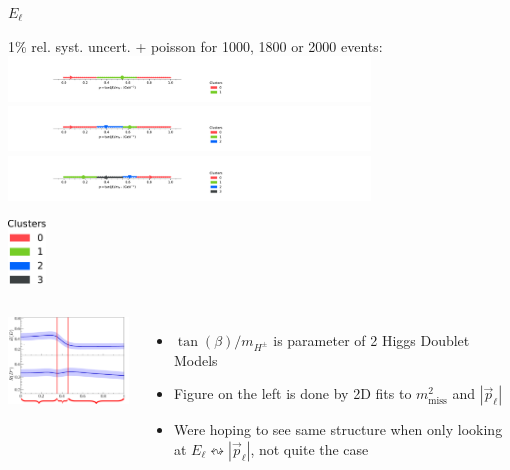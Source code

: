 \begin{frame}{$E_\ell$}{\relax}
	\centering
	\begin{changemargin}{-1cm}{-1cm}
	{
		\begin{minipage}{10cm}
			{\small 1\% rel. syst. uncert. + poisson for 1000, 1800 or 2000 events:}
			\centering
			{\includegraphics[clip, trim=4.5cm 1cm 21cm 2.0cm, height=1.2cm]{figures/from-paper/El_tanbeta_err1}}
			{\includegraphics[clip, trim=4.5cm 1cm 21cm 2.0cm, height=1.2cm]{figures/from-paper/El_tanbeta_err2}}
			{\includegraphics[clip, trim=4.5cm 1cm 21cm 2.0cm, height=1.2cm]{figures/from-paper/El_tanbeta_err3}}
	\end{minipage}
	}
	\begin{minipage}{2cm}
		\vspace{2cm}
		\includegraphics[height=1.7cm]{figures/from-paper/el_err3_legend.pdf}
	\end{minipage}
	\end{changemargin}
	\begin{columns}
	\includegraphics[width=5cm]{figures/type2_2hdm_vs_rd_rds_1205_5442_results_only_cluster.pdf}
	\begin{itemize}
	\item $\tan(\beta)/m_{H^\pm}$ is parameter of 2 Higgs Doublet Models 
	\item Figure on the left is done by 2D fits to $m_\text{miss}^2$ and $|\vec p_\ell|$
	\item Were hoping to see same structure when only looking at $E_\ell \leftrightsquigarrow |\vec p_\ell|$, not quite the case
	\end{itemize}
	\end{columns}
\end{frame}

